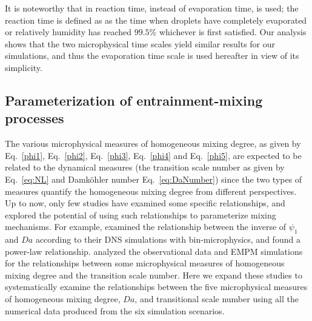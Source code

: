 \documentclass[draft,linenumbers]{agujournal}
\newcommand{\Eq}[1]{Eq.~\eqref{#1}} \newcommand{\Fig}[1]{Figure~\ref{#1}}
\begin{document}
It is noteworthy that in \citet{Lehmann2009} reaction time, instead of evaporation time, is used; the reaction time is defined as as the time when droplets have completely 
evaporated or relatively humidity has reached $99.5\%$ whichever is first satisfied. Our analysis shows that the two microphysical time scales yield similar results for our simulations, and thus the evaporation time scale is used hereafter in view of its simplicity.
 
\subsection{Parameterization of entrainment-mixing processes}
The various microphysical measures of homogeneous mixing degree, as given by \Eq{phi1}, \Eq{phi2}, \Eq{phi3}, \Eq{phi4} and \Eq{phi5}, are expected to be related to the dynamical measures (the transition scale number as given by \Eq{eq:NL} and Damk\"ohler number \Eq{eq:DaNumber}) since the two types of measures quantify the homogeneous mixing degree from different perspectives. Up to now, only few studies have examined some specific relationships, and explored the potential of using such relationships to parameterize mixing mechanisms. For example, \citet{And09} examined the relationship between the inverse of $\psi_1$ and $Da$ according to their DNS simulations with bin-microphysics, and found a power-law relationship. \citet{Lu2013, Lu2014} analyzed the observational data and EMPM simulations for the relationships between some microphysical measures of homogeneous mixing degree and the transition scale number. Here we expand these studies to systematically examine the relationships between the five microphysical measures of homogeneous mixing degree, $Da$, and transitional scale number using all the numerical data produced from the six simulation scenarios.
\end{document}
